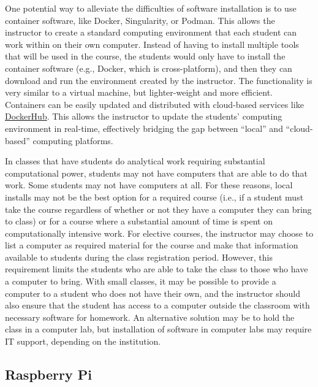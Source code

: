 One potential way to alleviate the difficulties of software installation is to
use container software, like
Docker,
Singularity,
or
Podman.
This allows the instructor to create a standard computing environment that each
student can work within on their own computer.
Instead of having to install multiple tools that will be used in the course,
the students would only have to install the container software (e.g., Docker,
which is cross-platform), and then they can download and run the environment
created by the instructor.
The functionality is very similar to a virtual machine, but lighter-weight and
more efficient.
Containers can be easily updated and distributed with cloud-based
services like
\href{https://hub.docker.com/}{DockerHub}.
This allows the instructor to update the students' computing environment in
real-time, effectively bridging the gap between ``local'' and ``cloud-based''
computing platforms.

In classes that have students do analytical work requiring substantial computational power, students may not have computers that are able to do that work. Some students may not have computers at all. For these reasons, local installs may not be the best option for a required course (i.e., if a student must take the course regardless of whether or not they have a computer they can bring to class) or for a course where a substantial amount of time is spent on computationally intensive work. For elective courses, the instructor may choose to list a computer as required material for the course and make that information available to students during the class registration period. However, this requirement limits the students who are able to take the class to those who have a computer to bring. With small classes, it may be possible to provide a computer to a student who does not have their own, and the instructor should also ensure that the student has access to a computer outside the classroom with necessary software for homework. An alternative solution may be to hold the class in a computer lab, but installation of software in computer labs may require IT support, depending on the institution.

\subsection{Raspberry Pi}\label{RaspberryPi}

